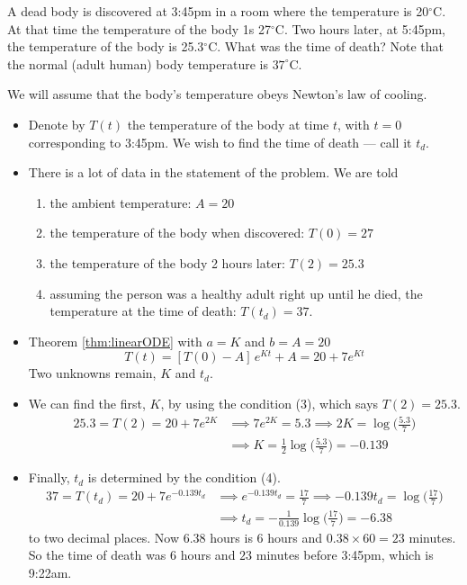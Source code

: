 \begin{eg}\label{eg:SDEcoolingC}
A dead body is discovered at 3:45pm in a room where the temperature
is 20$^\circ$C. At that time the temperature of the
body 1s 27$^\circ$C.  Two hours later, at 5:45pm, the temperature of the body
is 25.3$^\circ$C. What was the time of death?
Note that the normal (adult human) body temperature is $37^\circ$C.


\soln
We will assume that the body's temperature obeys Newton's law of cooling.
\begin{itemize}
\item
Denote by $T(t)$ the temperature of the body at time $t$, with $t=0$
corresponding to 3:45pm. We wish to find the time of death ---
call it $t_d$.

\item
There is a lot of data in the statement of the problem. We are told
\begin{enumerate}[(1)]
\item the ambient temperature: $A=20$
\item the temperature of the body when discovered: $T(0)=27$
\item the temperature of the body 2 hours later: $T(2)=25.3$
\item assuming the person was a healthy adult right up until he died, the
temperature at the time of death: $T(t_d)=37$.
\end{enumerate}

\item
Theorem \ref{thm:linearODE} with $a=K$ and $b=A=20$
\begin{equation*}
T(t) = [T(0)-A]\,e^{Kt} + A
      =20+7 e^{Kt}
\end{equation*}
Two unknowns remain, $K$ and $t_d$.

\item
We can find the first, $K$, by using the condition (3), which
says $T(2)=25.3$.
\begin{align*}
25.3=T(2) = 20+7 e^{2K}
&\implies 7 e^{2K}=5.3
\implies 2K = \log\big(\tfrac{5.3}{7}\big) \\
&\implies K = \tfrac{1}{2} \log\big(\tfrac{5.3}{7}\big) = -0.139
\end{align*}

\item
Finally, $t_d$ is determined by the condition (4).
\begin{align*}
37 = T(t_d) = 20+7 e^{-0.139 t_d}
&\implies e^{-0.139 t_d} = \tfrac{17}{7}
\implies -0.139 t_d =\log\big(\tfrac{17}{7}\big) \\
&\implies t_d = -\tfrac{1}{0.139}\log\big(\tfrac{17}{7}\big)
 = - 6.38
\end{align*}
to two decimal places.
Now $6.38$ hours is $6$ hours and $0.38\times 60 = 23$ minutes. So the
time of death was $6$ hours and $23$ minutes before 3:45pm, which is
9:22am.
\end{itemize}
\end{eg}


